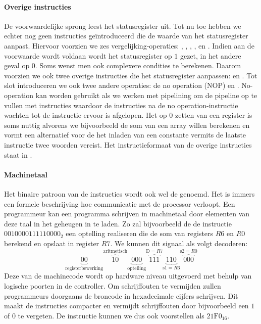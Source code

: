 \paragraph{Overige instructies}
De voorwaardelijke sprong leest het statusregister uit. Tot nu toe hebben we echter nog geen instructies ge\"introduceerd die de waarde van het statusregister aanpast. Hiervoor voorzien we zes vergelijking-operaties: , , , ,  en . Indien aan de voorwaarde wordt voldaan wordt het statusregister op $1$ gezet, in het andere geval op $0$. Soms wenst men ook complexere condities te berekenen. Daarom voorzien we ook twee overige instructies die het statusregister aanpassen:  en . Tot slot introduceren we ook twee andere operaties: de no operation (NOP) en . No-operation kan worden gebruikt als we werken met pipelining om de pipeline op te vullen met instructies waardoor de instructies na de no operation-instructie wachten tot de instructie ervoor is afgelopen. Het op $0$ zetten van een register is soms nuttig alvorens we bijvoorbeeld de som van een array willen berekenen en vormt een alternatief voor de het inladen van een constante vermits de laatste instructie twee woorden vereist. Het instructieformaat van de overige instructies staat in .
\paragraph{Machinetaal}
Het binaire patroon van de instructies wordt ook wel de  genoemd. Het is immers een formele beschrijving hoe communicatie met de processor verloopt. Een programmeur kan een programma schrijven in machinetaal door elementen van deze taal in het geheugen in te laden. Zo zal bijvoorbeeld de de instructie $0010000111110000_2$ een optelling realiseren die de som van registers $R6$ en $R0$ berekend en opslaat in register $R7$. We kunnen dit signaal als volgt decoderen:
\begin{equation}
\underbrace{00}_{\mbox{registerbewerking}}\overbrace{10}^{\mbox{aritmetisch}}\underbrace{000}_{\mbox{optelling}}\overbrace{111}^{\mbox{D}=R7}\underbrace{110}_{\mbox{s1}=R6}\overbrace{000}^{\mbox{s2}=R0}
\end{equation}
Deze  van de machinecode wordt op hardware niveau uitgevoerd met behulp van logische poorten in de controller. Om schrijffouten te vermijden zullen programmeurs doorgaans de broncode in hexadecimale cijfers schrijven. Dit maakt de instructies compacter en vermijdt schrijffouten door bijvoorbeeld een $1$ of $0$ te vergeten. De instructie kunnen we dus ook voorstellen als $21\mbox{F}0_{16}$.
